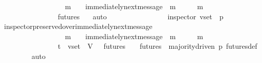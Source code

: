 \begin{isabellebody}
\ \ \ \ \ \ \ \ \ \ \ \ \ \ {\isacartoucheopen}{\isasymsigma}{\isacharprime}{\isacharprime}\ {\isasymin}\ {\isasymSigma}\ {\isasymand}\ m\ {\isasymin}\ {\isasymsigma}{\isacharprime}\ {\isasymand}\ immediately{\isacharunderscore}next{\isacharunderscore}message\ {\isacharparenleft}{\isasymsigma}{\isacharprime}{\isacharprime}{\isacharcomma}\ m{\isacharparenright}\ {\isasymand}\ {\isasymsigma}{\isacharprime}\ {\isacharequal}\ {\isasymsigma}{\isacharprime}{\isacharprime}\ {\isasymunion}\ {\isacharbraceleft}m{\isacharbraceright}\ {\isasymand}\ {\isasymsigma}\ {\isasymsubseteq}\ {\isasymsigma}{\isacharprime}{\isacharprime}{\isacartoucheclose}\isanewline
\ \ \ \ \ \ \ \ \ \ \ \ \ \ {\isacartoucheopen}{\isasymsigma}{\isacharprime}{\isacharprime}\ {\isasymin}\ futures\ {\isasymsigma}{\isacartoucheclose}\ \isamarkupfalse%
\ auto\ \ \ \ \ \ \ \ \isanewline
\ \ \ \ \ \isamarkupfalse%
\ \isamarkupfalse%
\ {\isachardoublequoteopen}inspector\ {\isacharparenleft}v{\isacharunderscore}set{\isacharcomma}\ {\isasymsigma}{\isacharprime}{\isacharcomma}\ p{\isacharparenright}{\isachardoublequoteclose}\isanewline
\ \ \ \ \ \ \ \isamarkupfalse%
\ inspector{\isacharunderscore}preserved{\isacharunderscore}over{\isacharunderscore}immediately{\isacharunderscore}next{\isacharunderscore}message\isanewline
\ \ \ \ \ \ \ \ \ \ \ \ \ \ {\isacartoucheopen}{\isasymsigma}{\isacharprime}{\isacharprime}\ {\isasymin}\ {\isasymSigma}\ {\isasymand}\ m\ {\isasymin}\ {\isasymsigma}{\isacharprime}\ {\isasymand}\ immediately{\isacharunderscore}next{\isacharunderscore}message\ {\isacharparenleft}{\isasymsigma}{\isacharprime}{\isacharprime}{\isacharcomma}\ m{\isacharparenright}\ {\isasymand}\ {\isasymsigma}{\isacharprime}\ {\isacharequal}\ {\isasymsigma}{\isacharprime}{\isacharprime}\ {\isasymunion}\ {\isacharbraceleft}m{\isacharbraceright}\ {\isasymand}\ {\isasymsigma}\ {\isasymsubseteq}\ {\isasymsigma}{\isacharprime}{\isacharprime}{\isacartoucheclose}\isanewline
\ \ \ \ \ \ \ \ \ \ \ \ \ \ {\isacartoucheopen}{\isasymsigma}\ {\isasymin}\ {\isasymSigma}t\ {\isasymand}\ v{\isacharunderscore}set\ {\isasymsubseteq}\ V{\isacartoucheclose}\ {\isacartoucheopen}{\isasymsigma}{\isacharprime}\ {\isasymin}\ futures\ {\isasymsigma}{\isacartoucheclose}\ {\isacartoucheopen}{\isasymsigma}{\isacharprime}{\isacharprime}\ {\isasymin}\ futures\ {\isasymsigma}{\isacartoucheclose}\ {\isacartoucheopen}majority{\isacharunderscore}driven\ p{\isacartoucheclose}\ futures{\isacharunderscore}def\isanewline
\ \ \ \ \ \ \ \isamarkupfalse%
\ auto\ \isanewline

\end{isabellebody}
